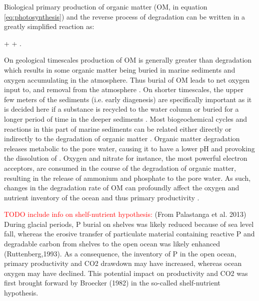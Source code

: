 \documentclass[gmd, manuscript]{copernicus}
\begin{document}
Biological primary production of organic matter (OM,  in equation \ref{eq:photosynthesis}) and the reverse process of degradation can be written in a greatly simplified reaction as:
\begin{reaction}
+ \rightleftharpoons {} + .\label{eq:photosynthesis}
\end{reaction}
On geological timescales production of OM is generally greater than degradation which results in some organic matter being buried in marine sediments and oxygen accumulating in the atmosphere. 
Thus burial of OM leads to net oxygen input to, and  removal from the atmosphere \citep{berner_phanerozoic_2004}. 
On shorter timescales, the upper few meters of the sediments (i.e. early diagenesis) are specifically important as it is decided here if a substance is recycled to the water column or buried for a longer period of time in the 
deeper sediments \citep{hensen_benthic_2006}. 
Most biogeochemical cycles and reactions in this part of marine sediments can be related either directly or indirectly to the degradation of organic matter \citep[e.g][]{boudreau_reactive_1991, arndt_quantifying_2013}. 
Organic matter degradation releases metabolic  to the pore water, causing it to have a lower pH and provoking the dissolution of  \citep{emerson_carbon_1981}.
Oxygen and nitrate for instance, the most powerful electron acceptors, are consumed in the course of the degradation of organic matter, resulting in the release of ammonium and phosphate to the pore water. 
As such, changes in the degradation rate of OM can profoundly affect the oxygen and nutrient inventory of the ocean and thus primary productivity \citep{van_cappellen_benthic_1994, lenton_redfield_2000}. 


\textcolor{red}{TODO include info on shelf-nutrient hypothesis:} (From Palastanga et al. 2013) 
During  glacial  periods,  P  burial  on  shelves was likely reduced because of sea level fall, whereas the 
erosive transfer of particulate material containing reactive P and degradable carbon from shelves to the open ocean was likely
enhanced (Ruttenberg,1993). As a consequence, the inventory of P in the open ocean, primary productivity and CO2 
drawdown may have increased, whereas ocean oxygen may have declined. This potential impact on productivity and CO2 
was first brought forward by Broecker (1982) in the so-called shelf-nutrient hypothesis.
\end{document}
